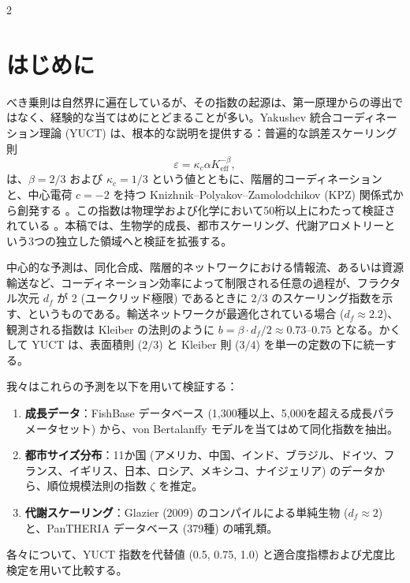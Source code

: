 \documentclass[11pt,a4paper]{article}
\newcommand{\eps}{\varepsilon}
\newcommand{\kappac}{\kappa_c}
\newcommand{\Keff}{K_{\mathrm{eff}}}
\newcommand{\betaf}{\beta}
\newcommand{\df}{d_f}
\begin{document}
	\vspace{0.4cm}
	\vspace*{-\baselineskip}
	\begin{multicols}{2}
		
		\section{はじめに}
		
		べき乗則は自然界に遍在しているが、その指数の起源は、第一原理からの導出ではなく、経験的な当てはめにとどまることが多い。Yakushev 統合コーディネーション理論 (YUCT) は、根本的な説明を提供する：普遍的な誤差スケーリング則
		\[
		\eps = \kappac \alpha \Keff^{-\betaf},
		\]
		は、\(\betaf = 2/3\) および \(\kappac = 1/3\) という値とともに、階層的コーディネーションと、中心電荷 \(c = -2\) を持つ Knizhnik–Polyakov–Zamolodchikov (KPZ) 関係式から創発する \cite{AppendixY, AppendixL}。この指数は物理学および化学において50桁以上にわたって検証されている \cite{AppendixC, AppendixG}。本稿では、生物学的成長、都市スケーリング、代謝アロメトリーという3つの独立した領域へと検証を拡張する。
		
		中心的な予測は、同化合成、階層的ネットワークにおける情報流、あるいは資源輸送など、コーディネーション効率によって制限される任意の過程が、フラクタル次元 \(\df\) が 2 (ユークリッド極限) であるときに \(2/3\) のスケーリング指数を示す、というものである。輸送ネットワークが最適化されている場合 (\(\df \approx 2.2\))、観測される指数は Kleiber の法則のように \(b = \betaf \cdot \df/2 \approx 0.73\)–\(0.75\) となる。かくして YUCT は、表面積則 (\(2/3\)) と Kleiber 則 (\(3/4\)) を単一の定数の下に統一する。
		
		我々はこれらの予測を以下を用いて検証する：
		\begin{enumerate}
			\item \textbf{成長データ}：FishBase データベース (1,300種以上、5,000を超える成長パラメータセット) から、von Bertalanffy モデルを当てはめて同化指数を抽出。
			\item \textbf{都市サイズ分布}：11か国 (アメリカ、中国、インド、ブラジル、ドイツ、フランス、イギリス、日本、ロシア、メキシコ、ナイジェリア) のデータから、順位規模法則の指数 \(\zeta\) を推定。
			\item \textbf{代謝スケーリング}：Glazier (2009) のコンパイルによる単純生物 (\(\df \approx 2\)) と、PanTHERIA データベース (379種) の哺乳類。
		\end{enumerate}
		各々について、YUCT 指数を代替値 (0.5, 0.75, 1.0) と適合度指標および尤度比検定を用いて比較する。
		

\end{multicols}
\end{document}
